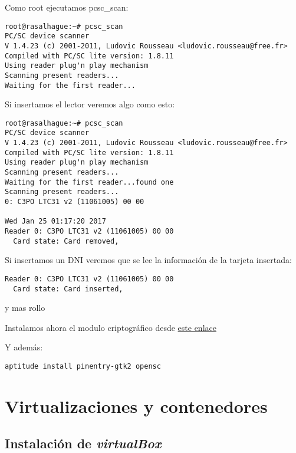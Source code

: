 \documentclass[
  12pt,
  spanish,
]{article}
\begin{document}
Como root ejecutamos pcsc\_scan:

\begin{verbatim}
root@rasalhague:~# pcsc_scan 
PC/SC device scanner
V 1.4.23 (c) 2001-2011, Ludovic Rousseau <ludovic.rousseau@free.fr>
Compiled with PC/SC lite version: 1.8.11
Using reader plug'n play mechanism
Scanning present readers...
Waiting for the first reader...
\end{verbatim}

Si insertamos el lector veremos algo como esto:

\begin{verbatim}
root@rasalhague:~# pcsc_scan 
PC/SC device scanner
V 1.4.23 (c) 2001-2011, Ludovic Rousseau <ludovic.rousseau@free.fr>
Compiled with PC/SC lite version: 1.8.11
Using reader plug'n play mechanism
Scanning present readers...
Waiting for the first reader...found one
Scanning present readers...
0: C3PO LTC31 v2 (11061005) 00 00

Wed Jan 25 01:17:20 2017
Reader 0: C3PO LTC31 v2 (11061005) 00 00
  Card state: Card removed,
\end{verbatim}

Si insertamos un DNI veremos que se lee la información de la tarjeta
insertada:

\begin{verbatim}
Reader 0: C3PO LTC31 v2 (11061005) 00 00
  Card state: Card inserted, 
\end{verbatim}

y mas rollo

Instalamos ahora el modulo criptográfico desde
\href{https://www.dnielectronico.es/PortalDNIe/PRF1_Cons02.action?pag=REF_1112}{este
enlace}

Y además:

\begin{verbatim}
aptitude install pinentry-gtk2 opensc
\end{verbatim}

\hypertarget{virtualizaciones-y-contenedores}{%
\section{Virtualizaciones y
contenedores}\label{virtualizaciones-y-contenedores}}

\hypertarget{instalaciuxf3n-de-virtualbox}{%
\subsection{\texorpdfstring{Instalación de
\emph{virtualBox}}{Instalación de virtualBox}}\label{instalaciuxf3n-de-virtualbox}}
\end{document}
